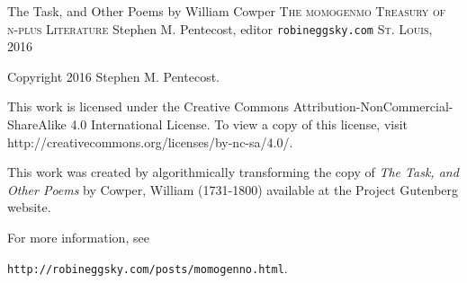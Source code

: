 \documentclass{book}
\begin{document}
{\fontsize{10pt}{12pt}\selectfont
\newpage
\null

\newpage
\begin{center}
{\Huge
\vspace*{10.0mm}
The Task,
\linebreak
\linebreak
and Other Poems
\linebreak
\linebreak
}
\linebreak
\linebreak
{\Large
by
\linebreak
\linebreak
}
{\huge
William Cowper
}
\linebreak
\linebreak
\linebreak
\linebreak
\linebreak
\linebreak
\linebreak
\linebreak
\linebreak
{\Large 
\textsc{The momogenmo Treasury} 
\linebreak
\linebreak
\textsc{of} 
\linebreak
\linebreak
\textsc{n-plus Literature}
\linebreak
\linebreak
\linebreak
}
{\large 
Stephen M. Pentecost, editor
}
\linebreak
\linebreak
\linebreak
\linebreak
{\LARGE 
\texttt{robineggsky.com}
}
\linebreak
\linebreak
{\Large 
\textsc{St. Louis, 2016}
}
\end{center}

\newpage
\vspace*{1.0in}
Copyright 2016 Stephen M. Pentecost.
\bigbreak
\bigbreak
\bigbreak
\par
This work is licensed under the Creative Commons Attribution-NonCommercial-ShareAlike 4.0 International License. To view a copy of this license, visit http://creativecommons.org/licenses/by-nc-sa/4.0/.
\bigbreak
\par
This work was created by algorithmically transforming the copy of \textit{The Task, and Other Poems} by Cowper, William (1731-1800) available at the Project Gutenberg website.
\bigbreak
\par
For more information, see
\par
\vspace*{0.10in}
\texttt{http://robineggsky.com/posts/momogenno.html}.
\par

}
\end{document}
